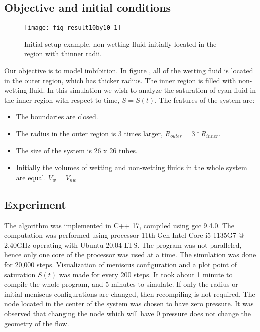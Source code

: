 \subsection{Objective and initial conditions} \label{sec:exp-init}
	\begin{figure}[H]
		\centering
		\texttt{[image: fig\_result10by10\_1]}
		\caption{Initial setup example, non-wetting fluid initially located in the region with thinner radii.}
		\label{fig:invasion-result1}
	\end{figure}	
	
	Our objective is to model imbibition. In figure \label{fig:invasion-result1}, all of the wetting fluid is located in the outer region, which has thicker radius. The inner region is filled with non-wetting fluid. In this simulation we wish to analyze the saturation of cyan fluid in the inner region with respect to time, $S = S(t)$. The features of the system are:
	
	\begin{itemize}
		\item The boundaries are closed.
		\item The radius in the outer region is 3 times larger, $R_{outer} = 3 * R_{inner}$.
		\item The size of the system is 26 x 26 tubes.
		\item Initially the volumes of wetting and non-wetting fluids in the whole system are equal. $V_{w} = V_{nw}$
	\end{itemize}
	
\subsection{Experiment} \label{sec:exp-main}
	The algorithm was implemented in C++ 17, compiled using gcc 9.4.0. The computation was performed using processor 11th Gen Intel Core i5-1135G7 @ 2.40GHz operating with Ubuntu 20.04 LTS. The program was not paralleled, hence only one core of the processor was used at a time.  The simulation was done for 20,000 steps. Visualization of meniscus configuration and a plot point of saturation $S(t)$ was made for every 200 steps. It took about 1 minute to compile the whole program, and 5 minutes to simulate. If only the radius or initial meniscus configurations are changed, then recompiling is not required. The node located in the center of the system was chosen to have zero pressure. It was observed that changing the node which will have 0 pressure does not change the geometry of the flow.
	
